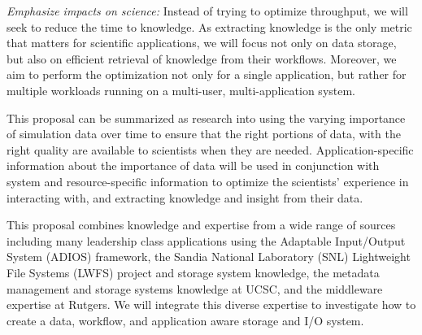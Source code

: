 \begin{tightItemize}
\item
{\em Emphasize impacts on science:}
Instead of trying to optimize throughput, we will seek to reduce the time to knowledge.
As extracting knowledge is the only metric that matters for scientific applications, we will
focus not only on data storage, but also on efficient retrieval of knowledge from their 
workflows.
Moreover, we aim to perform the optimization not only for a single
application, but rather for multiple workloads running on a multi-user, multi-application
system.
\end{tightItemize}

This proposal can be summarized as research into using the varying importance of simulation data over time to
ensure that the right portions of data, with the right quality  are available to scientists when they are needed.
Application-specific information about the importance of data will be used in conjunction with system and resource-specific information
to optimize the scientists' experience in interacting with, and extracting knowledge and insight from their data.


This proposal combines knowledge and expertise 
from a wide range of sources including many leadership class applications using the Adaptable Input/Output System (ADIOS) framework,
the Sandia National Laboratory (SNL) Lightweight File Systems (LWFS) project and storage system knowledge, the metadata
management and storage systems knowledge at UCSC, and the middleware expertise
at Rutgers. We will integrate this diverse expertise to investigate how to create
a data, workflow, and application aware storage and I/O system.

